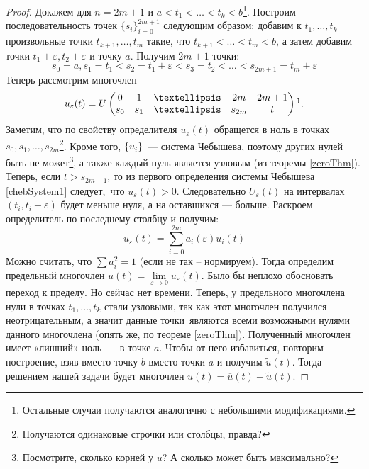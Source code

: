 \begin{proof}
Докажем для $n=2m+1$ и $a < t_1 < … < t_k < b$\footnote{Остальные случаи получаются аналогично с небольшими модификациями.}. Построим 
последовательность точек $\{s_i\}_{i=0}^{2m+1}$ следующим образом: добавим к $t_1,…, t_k$ произвольные точки $t_{k+1}, …, t_{m}$ такие, что $t_{k+1} < … < t_{m} < b$,  а затем добавим точки $t_1+\varepsilon, t_2 + \varepsilon$ и точку $a$. Получим $2m+1$ точки:
$$ s_0 = a, s_1=t_1 < s_2 = t_1 + \varepsilon < s_3 = t_2 < … < s_{2m+1} = t_{m}+\varepsilon$$
Теперь рассмотрим многочлен 
$$u_{\varepsilon}(t) = 
    U\begin{pmatrix}
        0 & 1 & … & 2m & 2m+1 \\
        s_0 & s_1 & … & s_{2m}& t\\
    \end{pmatrix}\footnotemark.
$$
Заметим, что по свойству определителя $u_{\varepsilon}(t)$ обращется в ноль в точках $s_0, s_1, …, s_{2m}$\footnote{Получаются одинаковые строчки
или столбцы, правда?}.
Кроме того, $\{u_i\}$ — система Чебышева, поэтому других нулей быть не может\footnote{Посмотрите, сколько корней у $u$? А сколько может быть максимально?}, 
а также каждый нуль является узловым (из теоремы \eqref{zeroThm}). Теперь, если $t > s_{2m+1}$, то из первого определения системы Чебышева \eqref{chebSystem1} следует, что $u_{\varepsilon}(t) > 0$. Следовательно $U_\varepsilon(t)$ на интервалах $(t_i, t_i+\varepsilon)$ будет меньше нуля, а на оставшихся — больше. Раскроем определитель по последнему столбцу и получим:
$$ u_\varepsilon(t) = \sum\limits_{i=0}^{2m} a_i(\varepsilon)u_i(t)$$
Можно считать, что $\sum a_i^2 = 1$ (если не так – нормируем). Тогда определим предельный многочлен $\overline{u}(t) = \lim \limits_{\varepsilon \rightarrow 0} u_\varepsilon(t)$.
{\color{blue} Было бы неплохо обосновать переход к пределу. Но сейчас нет времени.}
Теперь, у предельного многочлена нули в точках $t_1, …, t_k$ стали узловыми, так как этот многочлен получился неотрицательным,
а значит данные точки являются всеми возможными нулями данного многочлена (опять же, по теореме \eqref{zeroThm}). Полученный многочлен имеет «лишний» ноль — в точке $a$. Чтобы от него избавиться, повторим построение, взяв вместо точку $b$ вместо точки $a$ и получим $\tilde{u}(t)$. Тогда решением нашей задачи будет многочлен
$u(t) = \overline{u}(t) + \tilde{u}(t)$.
\end{proof}
